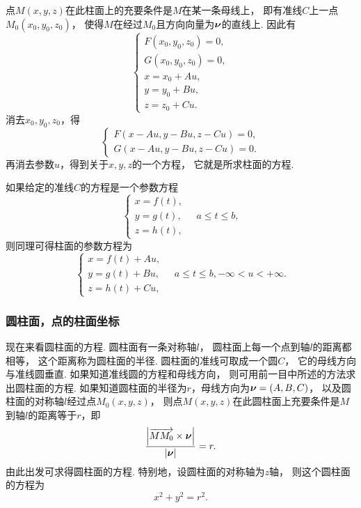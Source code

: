 点\(M(x,y,z)\)在此柱面上的充要条件是\(M\)在某一条母线上，
即有准线\(C\)上一点\(M_0(x_0,y_0,z_0)\)，
使得\(M\)在经过\(M_0\)且方向向量为\(\boldsymbol{\nu}\)的直线上.
因此有\[
	\left\{ \begin{array}{l}
		F(x_0,y_0,z_0) = 0, \\
		G(x_0,y_0,z_0) = 0, \\
		x = x_0 + Au, \\
		y = y_0 + Bu, \\
		z = z_0 + Cu.
	\end{array} \right.
\]
消去\(x_0,y_0,z_0\)，得\[
	\left\{ \begin{array}{l}
		F(x - Au,y - Bu,z - Cu) = 0, \\
		G(x - Au,y - Bu,z - Cu) = 0.
	\end{array} \right.
\]
再消去参数\(u\)，得到关于\(x,y,z\)的一个方程，
它就是所求柱面的方程.

如果给定的准线\(C\)的方程是一个参数方程\[
	\left\{ \begin{array}{l}
		x = f(t), \\
		y = g(t), \\
		z = h(t),
	\end{array} \right.
	\quad a \leqslant t \leqslant b,
\]
则同理可得柱面的参数方程为\[
	\left\{ \begin{array}{l}
		x = f(t) + Au, \\
		y = g(t) + Bu, \\
		z = h(t) + Cu,
	\end{array} \right.
	\quad
	a \leqslant t \leqslant b,
	-\infty < u < +\infty.
\]

\subsubsection{圆柱面，点的柱面坐标}
现在来看圆柱面的方程.
圆柱面有一条对称轴\(l\)，
圆柱面上每一个点到轴\(l\)的距离都相等，
这个距离称为圆柱面的半径.
圆柱面的准线可取成一个圆\(C\)，
它的母线方向与准线圆垂直.
如果知道准线圆的方程和母线方向，
则可用前一目中所述的方法求出圆柱面的方程.
如果知道圆柱面的半径为\(r\)，母线方向为\(\boldsymbol{\nu}=(A,B,C)\)，
以及圆柱面的对称轴\(l\)经过点\(M_0(x,y,z)\)，
则点\(M(x,y,z)\)在此圆柱面上充要条件是\(M\)到轴\(l\)的距离等于\(r\)，即\[
	\frac{\abs{\overrightarrow{M M_0} \times \boldsymbol{\nu}}}{\abs{\boldsymbol{\nu}}} = r.
\]
由此出发可求得圆柱面的方程.
特别地，设圆柱面的对称轴为\(z\)轴，
则这个圆柱面的方程为
\begin{equation}\label{equation:解析几何.以z轴为对称轴r为半径的圆柱面的一般方程}
	x^2+y^2=r^2.
\end{equation}

